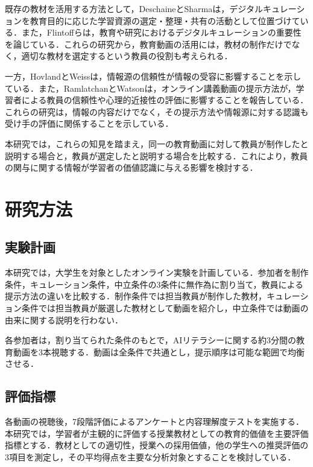 \documentclass[11pt]{ltjarticle}
\begin{document}
既存の教材を活用する方法として，DeschaineとSharma\cite{deschaine2015}は，デジタルキュレーションを教育目的に応じた学習資源の選定・整理・共有の活動として位置づけている．また，Flintoffら\cite{flintoff2014}は，教育や研究におけるデジタルキュレーションの重要性を論じている．これらの研究から，教育動画の活用には，教材の制作だけでなく，適切な教材を選定するという教員の役割も考えられる．

一方，HovlandとWeiss\cite{hovland1951}は，情報源の信頼性が情報の受容に影響することを示している．また，RamlatchanとWatson\cite{ramlatchan2020}は，オンライン講義動画の提示方法が，学習者による教員の信頼性や心理的近接性の評価に影響することを報告している．これらの研究は，情報の内容だけでなく，その提示方法や情報源に対する認識も受け手の評価に関係することを示している．

本研究では，これらの知見を踏まえ，同一の教育動画に対して教員が制作したと説明する場合と，教員が選定したと説明する場合を比較する．これにより，教員の関与に関する情報が学習者の価値認識に与える影響を検討する．

\section{研究方法}

\subsection{実験計画}

本研究では，大学生を対象としたオンライン実験を計画している．参加者を制作条件，キュレーション条件，中立条件の3条件に無作為に割り当て，教員による提示方法の違いを比較する．制作条件では担当教員が制作した教材，キュレーション条件では担当教員が厳選した教材として動画を紹介し，中立条件では動画の由来に関する説明を行わない．

各参加者は，割り当てられた条件のもとで，AIリテラシーに関する約3分間の教育動画を3本視聴する．動画は全条件で共通とし，提示順序は可能な範囲で均衡させる．

\subsection{評価指標}

各動画の視聴後，7段階評価によるアンケートと内容理解度テストを実施する．本研究では，学習者が主観的に評価する授業教材としての教育的価値を主要評価指標とする．教材としての適切性，授業への採用価値，他の学生への推奨評価の3項目を測定し，その平均得点を主要な分析対象とすることを検討している．
\end{document}
